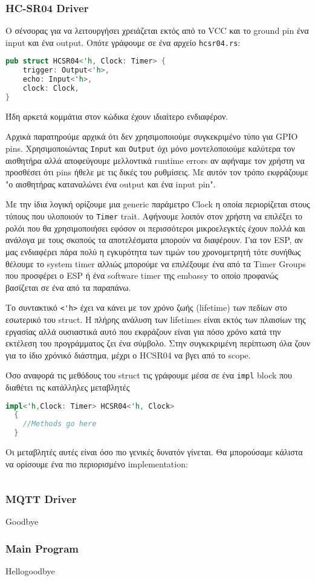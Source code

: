 \subsubsection{HC-SR04 Driver}

Ο σένσορας για να λειτουργήσει χρειάζεται εκτός από το VCC και το ground pin
ένα input και ένα output. Οπότε γράφουμε σε ένα αρχείο \verb|hcsr04.rs|:

\begin{lstlisting}[language=Rust]
pub struct HCSR04<'h, Clock: Timer> {
    trigger: Output<'h>,
    echo: Input<'h>,
    clock: Clock,
}
\end{lstlisting}

Ήδη αρκετά κομμάτια στον κώδικα έχουν ιδιαίτερο ενδιαφέρον.

Αρχικά παρατηρούμε αρχικά ότι δεν χρησιμοποιούμε συγκεκριμένο τύπο για
GPIO pins. Χρησιμοποιώντας \verb|Input| και \verb|Output| όχι μόνο
μοντελοποιούμε καλύτερα τον αισθητήρα αλλά αποφεύγουμε μελλοντικά
runtime errors αν αφήναμε τον χρήστη να προσθέσει ότι pins ήθελε με
τις δικές του ρυθμίσεις. Με αυτόν τον τρόπο εκφράζουμε "ο αισθητήρας καταναλώνει
ένα output και ένα input pin".

Με την ίδια λογική ορίζουμε μια generic παράμετρο Clock η οποία περιορίζεται
στους τύπους που υλοποιούν το \verb|Timer| trait. Αφήνουμε λοιπόν στον
χρήστη να επιλέξει το ρολόι που θα χρησιμοποιήσει εφόσον οι περισσότεροι
μικροελεγκτές έχουν πολλά και ανάλογα με τους σκοπούς τα αποτελέσματα
μπορούν να διαφέρουν. Για τον ESP, αν μας ενδιαφέρει πάρα πολύ η εγκυρότητα των τιμών
του χρονομετρητή τότε συνήθως θέλουμε το system timer αλλιώς μπορούμε να επιλέξουμε
ένα από τα Timer Groups που προσφέρει ο ESP ή ένα software timer της embassy το οποίο
προφανώς βασίζεται σε ένα από τα παραπάνω.

Το συντακτικό \verb|<'h>| έχει να κάνει με τον χρόνο ζωής (lifetime)
των πεδίων στο εσωτερικό του struct. Η πλήρης ανάλυση των lifetimes
είναι εκτός των πλαισίων της εργασίας αλλά ουσιαστικά αυτό που
εκφράζουν είναι για πόσο χρόνο κατά την εκτέλεση του προγράμματος ζει
ένα σύμβολο. Στην συγκεκριμένη περίπτωση όλα ζουν για το ίδιο χρόνικό
διάστημα, μέχρι ο HCSR04 να βγει από το scope.

Όσο αναφορά τις μεθόδους του struct τις γράφουμε μέσα σε ένα \verb|impl|
block που διαθέτει τις κατάλληλες μεταβλητές

\begin{lstlisting}[language=Rust]
  impl<'h,Clock: Timer> HCSR04<'h, Clock>
  {
    //Methods go here
  }
\end{lstlisting}

Οι μεταβλητές αυτές είναι όσο πιο γενικές δυνατόν γίνεται. Θα μπορούσαμε
κάλιστα να ορίσουμε ένα πιο περιορισμένο implementation:


\begin{lstlisting}[language=Rust]

\end{lstlisting}

\subsubsection{MQTT Driver}
Goodbye
\subsubsection{Main Program}
Hellogoodbye
